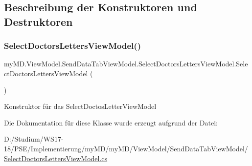\subsection{Beschreibung der Konstruktoren und Destruktoren}
\mbox{\label{classmy_m_d_1_1_view_model_1_1_send_data_tab_view_model_1_1_select_doctors_letters_view_model_a87c5e4323853a8ec4a634b011d26ae97}} 
\subsubsection{\texorpdfstring{Select\+Doctors\+Letters\+View\+Model()}{SelectDoctorsLettersViewModel()}}
{\footnotesize\ttfamily my\+M\+D.\+View\+Model.\+Send\+Data\+Tab\+View\+Model.\+Select\+Doctors\+Letters\+View\+Model.\+Select\+Doctors\+Letters\+View\+Model (\begin{DoxyParamCaption}{ }\end{DoxyParamCaption})}



Konstruktor für das Select\+Doctos\+Letter\+View\+Model 



Die Dokumentation für diese Klasse wurde erzeugt aufgrund der Datei\+:\begin{DoxyCompactItemize}
\item 
D\+:/\+Studium/\+W\+S17-\/18/\+P\+S\+E/\+Implementierung/my\+M\+D/my\+M\+D/\+View\+Model/\+Send\+Data\+Tab\+View\+Model/\mbox{\hyperlink{_select_doctors_letters_view_model_8cs}{Select\+Doctors\+Letters\+View\+Model.\+cs}}\end{DoxyCompactItemize}

